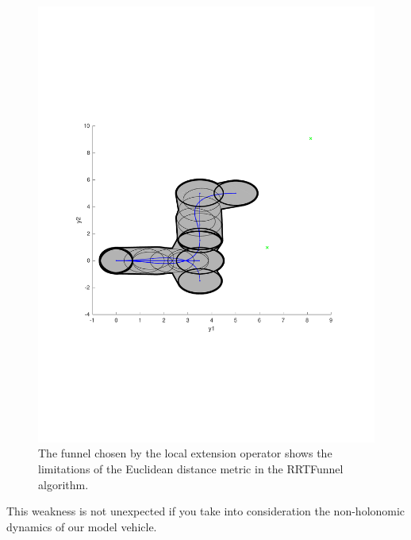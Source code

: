 \begin{figure}
\includegraphics[scale=.5]{figures/rrtfunnel/euclidean-distance-closest-funnel4}
\caption{The funnel chosen by the local extension operator shows the limitations
of the Euclidean distance metric in the RRTFunnel algorithm.}
\end{figure}

This weakness is not unexpected if you take into consideration the non-holonomic
dynamics of our model vehicle.


